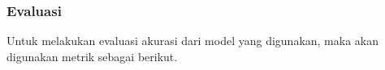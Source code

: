 \subsubsection{Evaluasi}

Untuk melakukan evaluasi akurasi dari model yang digunakan, maka akan digunakan metrik sebagai berikut.

